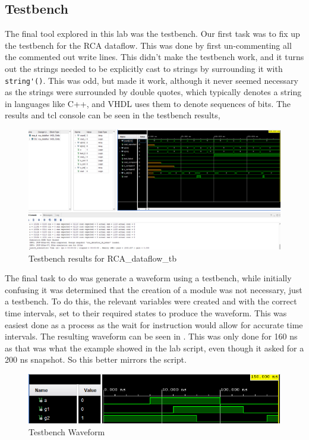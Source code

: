 \documentclass[a4paper, 12pt]{article}
\begin{document}
		\subsection{Testbench}
			The final tool explored in this lab was the testbench. Our first task was to fix up the testbench for the RCA dataflow. This was done by first un-commenting all the commented out write lines. This didn't make the testbench work, and it turns out the strings needed to be explicitly cast to strings by surrounding it with \lstinline{string'()}. This was odd, but made it work, although it never seemed necessary as the strings were surrounded by double quotes, which typically denotes a string in languages like C++, and VHDL uses them to denote sequences of bits. The results and tcl console can be seen in the testbench results, 
			\begin{figure}[!ht]
				\centering
				\includegraphics[width=0.9\columnwidth]{lab331.PNG}
				\caption{Testbench results for RCA\_dataflow\_tb}
				\label{fig:331}
			\end{figure}
			\par
			The final task to do was generate a waveform using a testbench, while initially confusing it was determined that the creation of a module was not necessary, just a testbench. To do this, the relevant variables were created and with the correct time intervals, set to their required states to produce the waveform. This was easiest done as a process as the wait for instruction would allow for accurate time intervals. The resulting waveform can be seen in . This was only done for 160 ns as that was what the example showed in the lab script, even though it asked for a 200 ns snapshot. So this better mirrors the script.
			\begin{figure}[!ht]
				\centering
				\includegraphics[width=0.9\columnwidth]{lab332.PNG}
				\caption{Testbench Waveform}
				\label{fig:332}
			\end{figure}
\end{document}

